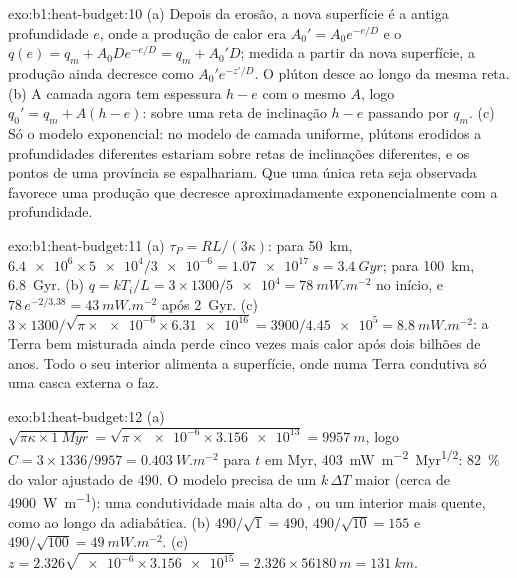 \begin{solution}{exo:b1:heat-budget:10}
(a) Depois da erosão, a nova superfície é a antiga profundidade $e$, onde a
produção de calor era $A_0' = A_0e^{-e/D}$ e o  $q(e) = q_m +
A_0De^{-e/D} = q_m + A_0'D$; medida a partir da nova superfície, a produção ainda
decresce como $A_0'e^{-z'/D}$. O plúton desce ao longo da mesma reta.
(b) A camada agora tem espessura $h - e$ com o mesmo $A$, logo $q_0' = q_m + A(h - e)$:
sobre uma reta de inclinação $h - e$ passando por $q_m$. (c) Só o modelo exponencial: no
modelo de camada uniforme, plútons erodidos a profundidades diferentes estariam sobre retas de
inclinações diferentes, e os pontos de uma província se espalhariam. Que uma única
reta seja observada favorece uma produção que decresce aproximadamente exponencialmente com a
profundidade.
\end{solution}

\begin{solution}{exo:b1:heat-budget:11}
(a) $\tau_P = RL/(3\kappa)$: para \qty{50}{km}, $\num{6.4e6}\times\num{5e4}/\num{3e-6}
= \qty{1.07e17}{s} = \qty{3.4}{Gyr}$; para \qty{100}{km}, \qty{6.8}{Gyr}.
(b) $q = kT_i/L = 3\times1300/\num{5e4} = \qty{78}{mW.m^{-2}}$ no início,
e $78\,e^{-2/3.38} = \qty{43}{mW.m^{-2}}$ após \qty{2}{Gyr}. (c)
$3\times1300/\sqrt{\pi\times\num{e-6}\times\num{6.31e16}} = 3900/\num{4.45e5} =
\qty{8.8}{mW.m^{-2}}$: a Terra bem misturada ainda perde cinco vezes mais calor
após dois bilhões de anos. Todo o seu interior alimenta a superfície, onde numa Terra
condutiva só uma casca externa o faz.
\end{solution}

\begin{solution}{exo:b1:heat-budget:12}
(a) $\sqrt{\pi\kappa\times\qty{1}{Myr}} = \sqrt{\pi\times\num{e-6}\times\num{3.156e13}}
= \qty{9957}{m}$, logo $C = 3\times1336/9957 = \qty{0.403}{W.m^{-2}}$ para
$t$ em Myr, \qty{403}{mW.m^{-2}.Myr^{1/2}}: \qty{82}{\percent} do valor ajustado de 490.
O modelo precisa de um $k\,\Delta T$ maior (cerca de \qty{4900}{W.m^{-1}}): uma
condutividade mais alta do , ou um interior mais quente, como ao longo da adiabática.
(b) $490/\sqrt1 = 490$, $490/\sqrt{10} = 155$ e $490/\sqrt{100} =
\qty{49}{mW.m^{-2}}$. (c) $z = 2.326\sqrt{\num{e-6}\times\num{3.156e15}} =
2.326\times\qty{56180}{m} = \qty{131}{km}$.
\end{solution}

